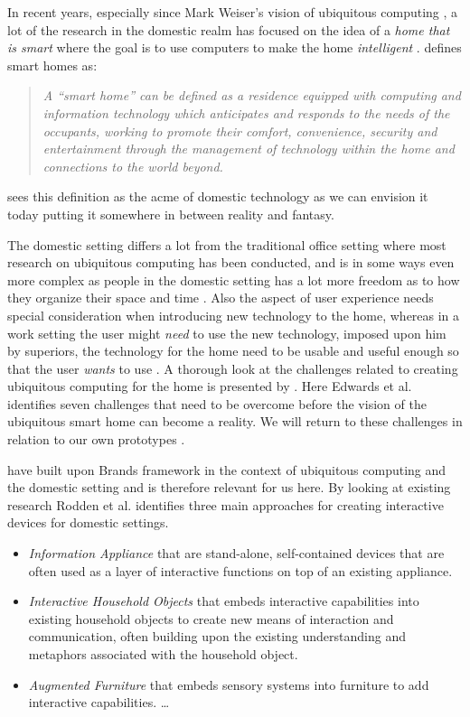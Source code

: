In recent years, especially since Mark Weiser's vision of ubiquitous computing \citep{weiser1991computer}, a lot of the research in the domestic realm has focused on the idea of a \emph{home that is smart} where the goal is to use computers to make the home \emph{intelligent} \citep{taylor2007homes}.
\citet{aldrich2003smart} defines smart homes as:

\begin{quotation}
\emph{A ``smart home'' can be defined as a residence equipped with computing and information technology which anticipates and responds to the needs of the occupants, working to promote their comfort, convenience, security and entertainment through the management of technology within the home and connections to the world beyond.}
\end{quotation}
\citeauthor{aldrich2003smart} sees this definition as the acme of domestic technology as we can envision it today putting it somewhere in between reality and fantasy.

The domestic setting differs a lot from the traditional office setting where most research on ubiquitous computing has been conducted, and is in some ways even more complex as people in the domestic setting has a lot more freedom as to how they organize their space and time \cite{meyer2003survey}.
Also the aspect of user experience needs special consideration when introducing new technology to the home, whereas in a work setting the user might \emph{need} to use the new technology, imposed upon him by superiors, the technology for the home need to be usable and useful enough so that the user \emph{wants} to use \citep{meyer2003survey}.
A thorough look at the challenges related to creating ubiquitous computing for the home is presented by \citet{edwards2001home}.
Here Edwards et al. identifies seven challenges that need to be overcome before the vision of the ubiquitous smart home can become a reality. We will return to these challenges in relation to our own prototypes .

\citet{rodden2003evolution} have built upon Brands framework in the context of ubiquitous computing and the domestic setting and is therefore relevant for us here.
By looking at existing research Rodden et al. identifies three main approaches for creating interactive devices for domestic settings.

\begin{itemize}
  \item \emph{Information Appliance} that are stand-alone, self-contained devices that are often used as a layer of interactive functions on top of an existing appliance.
  \item \emph{Interactive Household Objects} that embeds interactive capabilities into existing household objects to create new means of interaction and communication, often building upon the existing understanding and metaphors associated with the household object.
  \item \emph{Augmented Furniture} that embeds sensory systems into furniture to add interactive capabilities. \ldots
\end{itemize}

